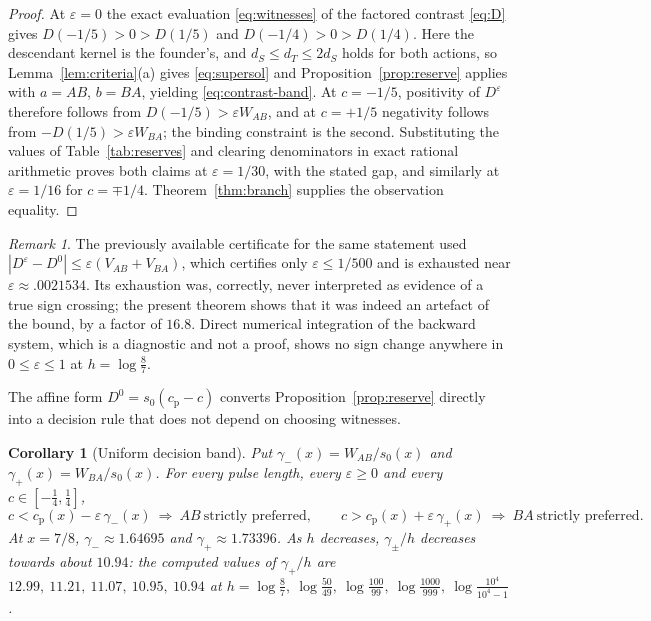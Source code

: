 \documentclass[11pt]{article}
\theoremstyle{plain}
\newtheorem{corollary}[theorem]{Corollary}
\theoremstyle{definition}
\theoremstyle{remark}
\newtheorem{remark}[theorem]{Remark}
\newcommand{\eps}{\varepsilon}
\newcommand{\cp}{c_{\mathrm p}}
\begin{document}
\begin{proof}
At $\eps=0$ the exact evaluation \eqref{eq:witnesses} of the factored contrast
\eqref{eq:D} gives $D(-1/5)>0>D(1/5)$ and $D(-1/4)>0>D(1/4)$. Here the
descendant kernel is the founder's, and $d_S\le d_T\le2d_S$ holds for both
actions, so Lemma~\ref{lem:criteria}(a) gives \eqref{eq:supersol} and
Proposition~\ref{prop:reserve} applies with $a=AB$, $b=BA$, yielding
\eqref{eq:contrast-band}. At $c=-1/5$, positivity of $D^{\eps}$ therefore
follows from $D(-1/5)>\eps W_{AB}$, and at $c=+1/5$ negativity follows from
$-D(1/5)>\eps W_{BA}$; the binding constraint is the second. Substituting the
values of Table~\ref{tab:reserves} and clearing denominators in exact rational
arithmetic proves both claims at $\eps=1/30$, with the stated gap, and
similarly at $\eps=1/16$ for $c=\mp1/4$. Theorem~\ref{thm:branch} supplies the
observation equality.
\end{proof}

\begin{remark}
The previously available certificate for the same statement used
$|D^\eps-D^0|\le\eps(V_{AB}+V_{BA})$, which certifies only $\eps\le1/500$ and
is exhausted near $\eps\approx.0021534$. Its exhaustion was, correctly, never
interpreted as evidence of a true sign crossing; the present theorem shows that
it was indeed an artefact of the bound, by a factor of $16.8$. Direct numerical
integration of the backward system, which is a diagnostic and not a proof,
shows no sign change anywhere in $0\le\eps\le1$ at $h=\log\frac87$.
\end{remark}

The affine form $D^0=s_0(\cp-c)$ converts Proposition~\ref{prop:reserve}
directly into a decision rule that does not depend on choosing witnesses.

\begin{corollary}[Uniform decision band]\label{cor:band}
Put $\gamma_-(x)=W_{AB}/s_0(x)$ and $\gamma_+(x)=W_{BA}/s_0(x)$. For every
pulse length, every $\eps\ge0$ and every $c\in[-\tfrac14,\tfrac14]$,
\[
 c<\cp(x)-\eps\,\gamma_-(x)\ \Longrightarrow\ AB\ \text{strictly preferred},
 \qquad
 c>\cp(x)+\eps\,\gamma_+(x)\ \Longrightarrow\ BA\ \text{strictly preferred}.
\]
At $x=7/8$, $\gamma_-\approx1.64695$ and $\gamma_+\approx1.73396$. As $h$
decreases, $\gamma_\pm/h$ decreases towards about $10.94$: the computed values
of $\gamma_+/h$ are $12.99,\ 11.21,\ 11.07,\ 10.95,\ 10.94$ at
$h=\log\frac87,\ \log\frac{50}{49},\ \log\frac{100}{99},\ \log\frac{1000}{999},\
\log\frac{10^4}{10^4-1}$.
\end{corollary}
\end{document}
